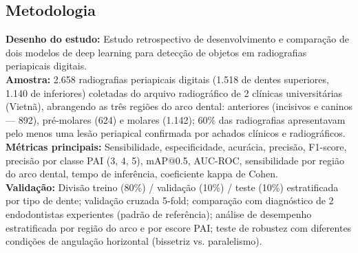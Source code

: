 \subsection{Metodologia}
\textbf{Desenho do estudo:} Estudo retrospectivo de desenvolvimento e
comparação de dois modelos de deep learning para detecção de objetos
em radiografias periapicais digitais. \\
\textbf{Amostra:} 2.658 radiografias periapicais digitais (1.518 de
dentes superiores, 1.140 de inferiores) coletadas do arquivo
radiográfico de 2 clínicas universitárias (Vietnã), abrangendo as
três regiões do arco dental: anteriores (incisivos e caninos — 892),
pré-molares (624) e molares (1.142); 60\% das radiografias
apresentavam pelo menos uma lesão periapical confirmada por
achados clínicos e radiográficos. \\
\textbf{Métricas principais:} Sensibilidade, especificidade, acurácia,
precisão, F1-score, precisão por classe PAI (3, 4, 5), mAP@0.5,
AUC-ROC, sensibilidade por região do arco dental, tempo de inferência,
coeficiente kappa de Cohen. \\
\textbf{Validação:} Divisão treino (80\%) / validação (10\%) / teste
(10\%) estratificada por tipo de dente; validação cruzada 5-fold;
comparação com diagnóstico de 2 endodontistas experientes (padrão
de referência); análise de desempenho estratificada por região do
arco e por escore PAI; teste de robustez com diferentes condições
de angulação horizontal (bissetriz vs. paralelismo).

